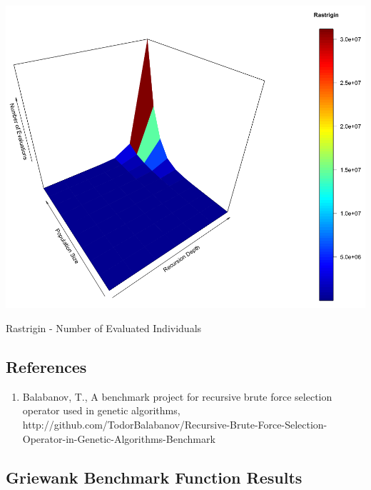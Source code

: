 \documentclass[a0,portrait,25pt]{sciposter}
\begin{document}
\begin{multicols}{3}
\begin{mdframed}[backgroundcolor=white,roundcorner=4pt,shadow=true,linewidth=1pt]
\begin{minipage}[c]{1\linewidth}
\includegraphics[width=0.9\linewidth]{fig05}
\caption{Rastrigin - Number of Evaluated Individuals}
\end{minipage}

\end{mdframed}

\begin{mdframed}[backgroundcolor=white,roundcorner=4pt,shadow=true,linewidth=1pt] \color{Black}

\section*{References}
\begin{enumerate}
  \item Balabanov, T., A benchmark project for recursive brute force selection operator used in genetic algorithms, http://github.com/TodorBalabanov/Recursive-Brute-Force-Selection-Operator-in-Genetic-Algorithms-Benchmark
\end{enumerate}
\end{mdframed}

\begin{mdframed}[backgroundcolor=white,roundcorner=4pt,shadow=true,linewidth=1pt] \color{Black}

\section*{Griewank Benchmark Function Results}


\end{mdframed}
\end{multicols}
\end{document}
